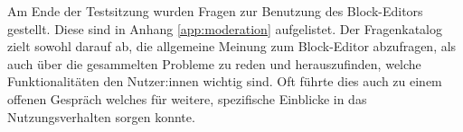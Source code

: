 Am Ende der Testsitzung wurden Fragen zur Benutzung des Block-Editors gestellt. Diese sind in Anhang \ref{app:moderation} aufgelistet. Der Fragenkatalog zielt sowohl darauf ab, die allgemeine Meinung zum Block-Editor abzufragen, als auch über die gesammelten Probleme zu reden und herauszufinden, welche Funktionalitäten den Nutzer:innen wichtig sind. Oft führte dies auch zu einem offenen Gespräch welches für weitere, spezifische Einblicke in das Nutzungsverhalten sorgen konnte.
